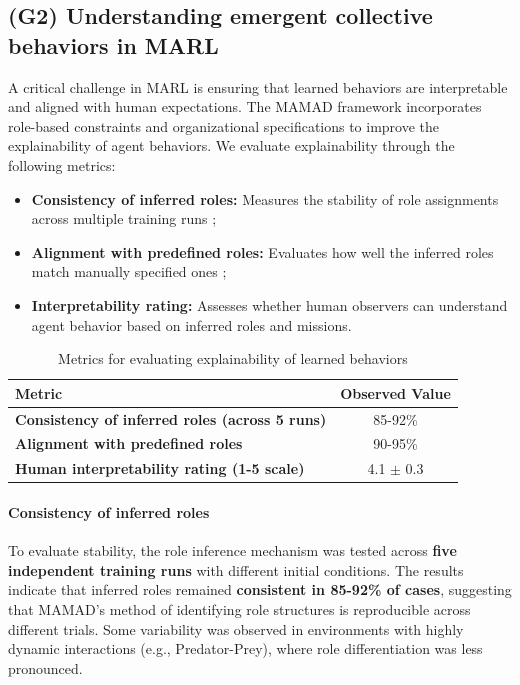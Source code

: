 \documentclass[pdflatex,sn-mathphys-num]{sn-jnl}%
\theoremstyle{thmstyleone}%
\theoremstyle{thmstyletwo}%
\theoremstyle{thmstylethree}%
\begin{document}
\subsection{(G2) Understanding emergent collective behaviors in MARL}

A critical challenge in MARL is ensuring that learned behaviors are interpretable and aligned with human expectations. The MAMAD framework incorporates role-based constraints and organizational specifications to improve the explainability of agent behaviors. We evaluate explainability through the following metrics:

\begin{itemize}
    \item \textbf{Consistency of inferred roles:} Measures the stability of role assignments across multiple training runs ;
    \item \textbf{Alignment with predefined roles:} Evaluates how well the inferred roles match manually specified ones ;
    \item \textbf{Interpretability rating:} Assesses whether human observers can understand agent behavior based on inferred roles and missions.
\end{itemize}

\begin{table}[h!]
    \centering
    \caption{Metrics for evaluating explainability of learned behaviors}
    \begin{tabular}{lc}
        \hline
        \textbf{Metric}                                        & \textbf{Observed Value} \\
        \hline
        \textbf{Consistency of inferred roles (across 5 runs)} & 85-92\%                 \\
        \hline
        \textbf{Alignment with predefined roles}               & 90-95\%                 \\
        \hline
        \textbf{Human interpretability rating (1-5 scale)}     & 4.1 $\pm$ 0.3           \\
        \hline
    \end{tabular}
    \label{tab:explainability}
\end{table}

\paragraph{Consistency of inferred roles}
To evaluate stability, the role inference mechanism was tested across \textbf{five independent training runs} with different initial conditions. The results indicate that inferred roles remained \textbf{consistent in 85-92\% of cases}, suggesting that MAMAD’s method of identifying role structures is reproducible across different trials. Some variability was observed in environments with highly dynamic interactions (e.g., Predator-Prey), where role differentiation was less pronounced.
\end{document}
